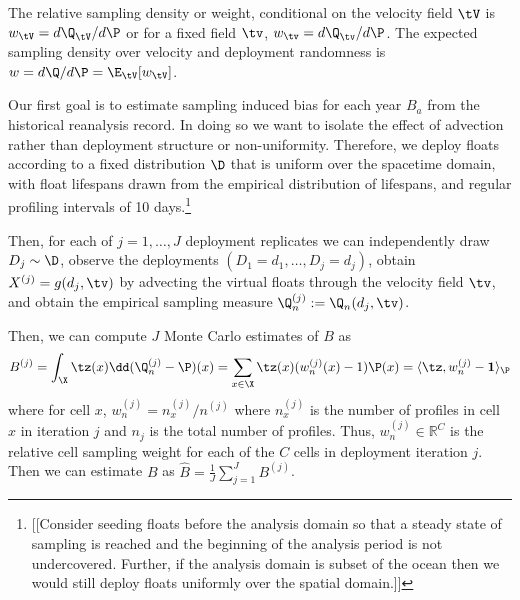 The relative sampling density or weight, conditional on the velocity field $\tV$ is $w_{\tV} = d\Q_{\tV}/d\P$ or for a fixed field $\tv$, $w_{\tv} = d\Q_{\tv}/d\P$.
The expected sampling density over velocity and deployment randomness is $w = d\Q/d\P = \E_{\tV}[w_{\tV}]$.


%

Our first goal is to estimate sampling induced bias for each year $B_a$ from the historical reanalysis record. In doing so we want to isolate the effect of advection rather than deployment structure or non-uniformity.
Therefore, we deploy floats according to a fixed distribution $\D$ that is uniform over the spacetime domain, with float lifespans drawn from the empirical distribution of lifespans, and regular profiling intervals of 10 days.\footnote{[[Consider seeding floats before the analysis domain so that a steady state of sampling is reached and the beginning of the analysis period is not undercovered. Further, if the analysis domain is subset of the ocean then we would still deploy floats uniformly over the spatial domain.]]}

Then, for each of $j = 1,\ldots,J$ deployment replicates we can independently draw $D_j \sim \D$, observe the deployments $(D_1 = d_1,\ldots,D_j = d_j)$, obtain  $X^{(j)} = g(d_j, \tv)$ by advecting the virtual floats through the velocity field $\tv$, and obtain the empirical sampling measure $\Q_n^{(j)} := \Q_n(d_j, \tv)$.

Then, we can compute $J$ Monte Carlo estimates of $B$ as
\begin{equation}
B^{(j)} = \int_{\X} \tz(x)\dd(\Q_n^{(j)} - \P)(x) = \sum_{x \in \X}\tz(x)(w_n^{(j)}(x) - 1)\P(x) = \langle\tz,w_n^{(j)} - \mathbf 1\rangle_{\P}  
\end{equation}
where for cell $x$, $w_n^{(j)} = n_x^{(j)} / n^{(j)}$ where $n_x^{(j)}$ is the number of profiles in cell $x$ in iteration $j$ and $n_j$ is the total number of profiles. Thus, $w_n^{(j)} \in \mathbb{R}^C$ is the relative cell sampling weight for each of the $C$ cells in deployment iteration $j$.
Then we can estimate $B$ as $\hat{B} = \frac1J\sum_{j = 1}^J B^{(j)}$.

